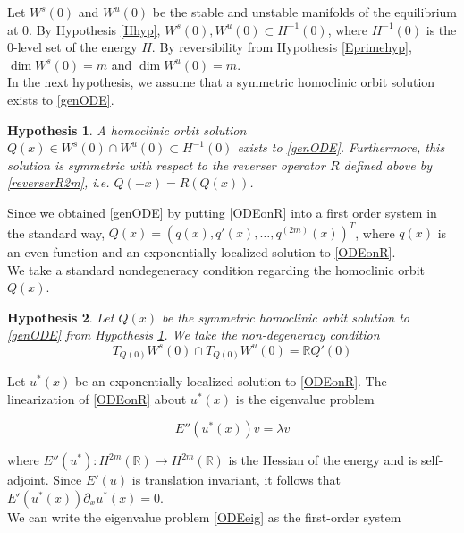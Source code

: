 \documentclass[12pt]{article}
\def\R{{\mathbb R}}
\newtheorem{hypothesis}{Hypothesis}
\begin{document}
Let $W^s(0)$ and $W^u(0)$ be the stable and unstable manifolds of the equilibrium at 0. By Hypothesis \ref{Hhyp}, $W^s(0), W^u(0) \subset H^{-1}(0)$, where $H^{-1}(0)$ is the 0-level set of the energy $H$. By reversibility from Hypothesis \ref{Eprimehyp}, $\dim W^s(0) = m$ and $\dim W^u(0) = m$.\\

In the next hypothesis, we assume that a symmetric homoclinic orbit solution exists to \eqref{genODE}.

\begin{hypothesis}\label{Qexistshyp}
A homoclinic orbit solution $Q(x) \in W^s(0) \cap W^u(0) \subset H^{-1}(0)$ exists to \eqref{genODE}. Furthermore, this solution is symmetric with respect to the reverser operator $R$ defined above by \eqref{reverserR2m}, i.e. $Q(-x) = R(Q(x))$.
\end{hypothesis}
 
Since we obtained \eqref{genODE} by putting \eqref{ODEonR} into a first order system in the standard way, $Q(x) = (q(x), q'(x), \dots, q^{(2m)}(x))^T$, where $q(x)$ is an even function and an exponentially localized solution to \eqref{ODEonR}.\\

We take a standard nondegeneracy condition regarding the homoclinic orbit $Q(x)$.

\begin{hypothesis}\label{nondegenhyp}
Let $Q(x)$ be the symmetric homoclinic orbit solution to \eqref{genODE} from Hypothesis \ref{Qexistshyp}. We take the non-degeneracy condition
\begin{equation}
T_{Q(0)}W^s(0) \cap T_{Q(0)}W^u(0) = \R Q'(0)
\end{equation}
\end{hypothesis}

Let $u^*(x)$ be an exponentially localized solution to \eqref{ODEonR}. The linearization of \eqref{ODEonR} about $u^*(x)$ is the eigenvalue problem

\begin{equation}\label{ODEeig}
E''(u^*(x)) v = \lambda v
\end{equation}

where $E''(u^*): H^{2m}(\R) \rightarrow H^{2m}(\R)$ is the Hessian of the energy and is self-adjoint. Since $E'(u)$ is translation invariant, it follows that $E'(u^*(x)) \partial_x u^*(x) = 0$.\\

We can write the eigenvalue problem \eqref{ODEeig} as the first-order system
\end{document}
